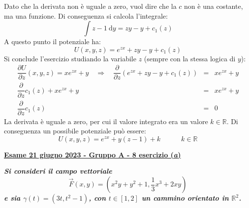 \documentclass[a4paper]{article}
\newcommand{\definition}[1]{\textcolor{Red3}{\textbf{#1}}}
\newcommand{\example}[1]{\textcolor{Green4}{\textbf{#1}}}
\begin{document}
	Dato che la derivata non è uguale a zero, vuol dire che la $c$ non è una costante, ma una funzione. Di conseguenza si calcola l'integrale:
	\begin{equation*}
		\displaystyle\int z-1 \:\mathrm{d}y = zy-y + c_{1}\left(z\right)
	\end{equation*}
	A questo punto il potenziale ha:
	\begin{equation*}
		U\left(x,y,z\right) = e^{zx} + zy - y + c_{1}\left(z\right)
	\end{equation*}
	Si conclude l'esercizio studiando la variabile $z$ (sempre con la stessa logica di $y$):
	\begin{equation*}
		\begin{array}{rcl}
			\dfrac{\partial U}{\partial z}\left(x,y,z\right) = xe^{zx}+y \hspace{1em}\Longrightarrow\hspace{1em} \dfrac{\partial}{\partial z}\left(e^{zx} + zy - y + c_{1}\left(z\right)\right) &=& xe^{zx}+y \\ [1em]
			\dfrac{\partial}{\partial z}c_{1}\left(z\right) + xe^{zx} + y &=& xe^{zx}+y \\ [1em]
			\dfrac{\partial}{\partial z}c_{1}\left(z\right) &=& 0
		\end{array}
	\end{equation*}
	La derivata è uguale a zero, per cui il valore integrato era un valore $k \in \mathbb{R}$. Di conseguenza un possibile potenziale può essere:
	\begin{equation*}
		U\left(x,y,z\right) = e^{zx} + y\left(z-1\right) + k \hspace{3em} k \in \mathbb{R}
	\end{equation*}

	\newpage

	\begin{flushleft}
		\label{exam: esame 21 giugno 2023 - Gruppo A - 8 esercizio (a)}
		\hypertarget{
			exam: esame 21 giugno 2023 - Gruppo A - 8 esercizio (a)
		}{
			\definition{\underline{Esame 21 giugno 2023 - Gruppo A - 8 esercizio (\emph{a})}}
		}
	\end{flushleft}
	\example{\emph{Si consideri il campo vettoriale}
	\begin{equation*}
		\overset{\rightarrow}{F}\left(x,y\right) = \left(x^{2}y+y^{2}+1, \dfrac{1}{3}x^{3}+2xy\right)
	\end{equation*}
	\emph{e sia $\gamma\left(t\right) = \left(3t, t^{2}-1\right)$, con $t \in \left[1,2\right]$ un cammino orientato in $\mathbb{R}^{2}$.}}
\end{document}
